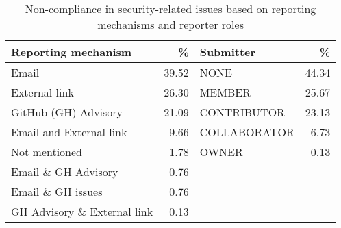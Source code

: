 
\begin{table}[h!]
\centering
\caption{Non-compliance in security-related issues based on reporting mechanisms and reporter roles}
\label{tab:issue_reporting_mechaism_submitter}
\begin{tabular}{p{2.9cm}r p{2.0cm}r}
\toprule
\textbf{Reporting mechanism} & \textbf{\%} & \textbf{Submitter} & \textbf{\%} \\ \midrule
Email & 39.52 & NONE & 44.34 \\
External link & 26.30 & MEMBER & 25.67 \\
GitHub (GH) Advisory & 21.09 & CONTRIBUTOR & 23.13 \\
Email and External link & 9.66 & COLLABORATOR & 6.73 \\
Not mentioned & 1.78 & OWNER & 0.13 \\
Email \& GH Advisory & 0.76 &  &  \\
Email \& GH issues & 0.76 &  &  \\ 
GH Advisory \& External link & 0.13 &  &  \\ \bottomrule
\end{tabular}
\end{table}

